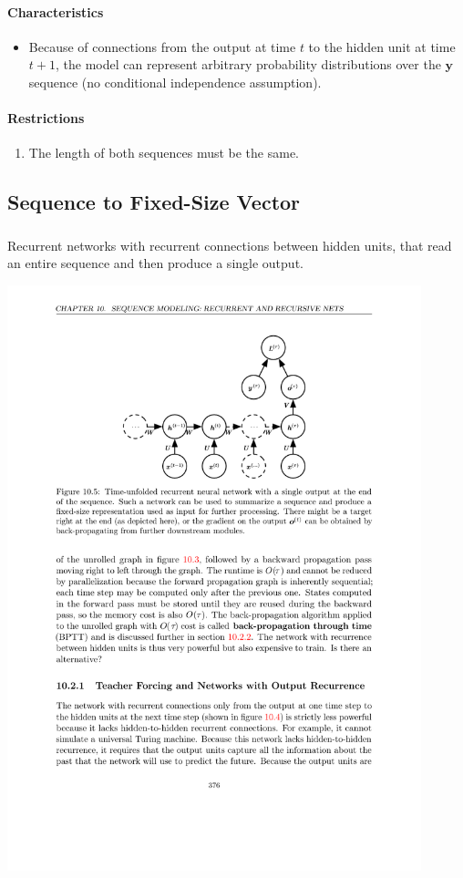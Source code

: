 \documentclass[12pt, a4paper]{article}
\def\vy{\boldsymbol{y}}
\begin{document}
\paragraph{Characteristics}
\begin{itemize}
    \item Because of connections from the output at time $t$ to the hidden unit at time $t+1$, the model can represent arbitrary probability distributions over the $\vy$ sequence (no conditional independence assumption).
\end{itemize}
\paragraph{Restrictions}
\begin{enumerate}
    \item The length of both sequences must be the same.
\end{enumerate}


\subsection{Sequence to Fixed-Size Vector}
\subsubsection{}
Recurrent networks with recurrent connections between hidden units, that read an entire sequence and then produce a single output.
\begin{center}
    \includegraphics[width=0.9\textwidth]{../imgs/RNN_3.pdf}
\end{center}
\end{document}
